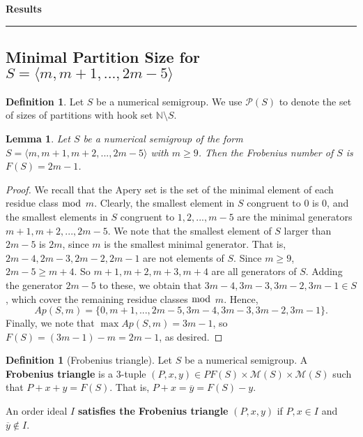 \documentclass[11pt,letterpaper]{article}
\newtheorem{lem}[thm]{Lemma}
\theoremstyle{definition}
\newtheorem{defn}[thm]{Definition}
\begin{document}
\pagestyle{plain}

\vspace{.7cm}\begin{center}\vspace{-1cm}
\textbf{\large Results}\\

\end{center}

\hrule


\begin{center}\section{Minimal Partition Size for $S=\langle m,m+1,...,2m-5\rangle$}\end{center}

\begin{defn}
    Let $S$ be a numerical semigroup. We use $\mathcal{P}(S)$ to denote the set of sizes of partitions with hook set $\mathbb{N} \setminus S$.
\end{defn}

\begin{lem}
    \label{Frob}
    Let $S$ be a numerical semigroup of the form $S=\langle m,m+1,m+2,...,2m-5\rangle$ with $m\geq 9$. Then the Frobenius number of $S$ is $F(S)=2m-1$.
\end{lem}

\begin{proof}
    We recall that the Apery set is the set of the minimal element of each residue class $\bmod$ $m$. Clearly, the smallest element in $S$ congruent to $0$ is $0$, and the smallest elements in $S$ congruent to $1, 2, ..., m-5$ are the minimal generators $m+1, m+2, ..., 2m-5$. We note that the smallest element of $S$ larger than $2m-5$ is $2m$, since $m$ is the smallest minimal generator. That is, $2m-4,2m-3,2m-2,2m-1$ are not elements of $S$. Since $m \geq 9$, $2m-5 \geq m + 4$. So $m+1, m+2, m+3, m+4$ are all generators of $S$. Adding the generator $2m-5$ to these, we obtain that $3m-4, 3m-3, 3m-2, 3m-1\in S$, which cover the remaining residue classes $\bmod$ $m$. Hence, 
    $$Ap(S,m)=\{0,m+1,...,2m-5,3m-4,3m-3,3m-2,3m-1\}.$$
    Finally, we note that $\max Ap(S, m) = 3m-1$, so $F(S) = (3m-1)-m = 2m-1$, as desired.
    
\end{proof}     

\begin{defn}[Frobenius triangle]
    Let $S$ be a numerical semigroup. A \textbf{Frobenius triangle} is a 3-tuple $(P, x,y)\in PF(S) \times \mathcal{M}(S) \times \mathcal{M}(S)$ such that $P+x+y =F(S)$. That is, $P+x = \overline{y}=F(S) -y$.

    An order ideal $I$ \textbf{satisfies the Frobenius triangle} $(P, x, y)$ if $P, x \in I$ and $\overline{y} \notin I$.
\end{defn}
\end{document}

